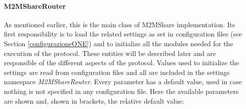 \paragraph{M2MShareRouter}
As mentioned earlier, this is the main class of M2MShare implementation. Its first responsibility is to load the related settings as set in configuration files (see Section \ref{configurazioneONE}) and to initialize all the modules needed for the execution of the protocol. These entities will be described later and are responsible of the different aspects of the protocol. Values used to initialize the settings are read from configuration files and all are included in the settings namespace \textit{M2MShareRouter}. Every parameter has a default value, used in case nothing is not specified in any configuration file. Here the available parameters are shown and, shown in brackets, the relative default value:
